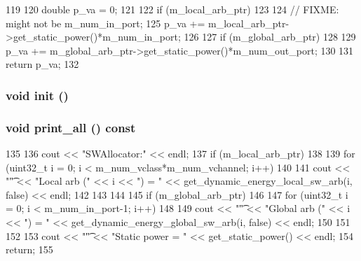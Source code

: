 \begin{DoxyCode}
119 {
120     double p_va = 0;
121 
122     if (m_local_arb_ptr)
123     {
124         // FIXME: might not be m_num_in_port;
125         p_va += m_local_arb_ptr->get_static_power()*m_num_in_port;
126     }
127     if (m_global_arb_ptr)
128     {
129         p_va += m_global_arb_ptr->get_static_power()*m_num_out_port;
130     }
131     return p_va;
132 }
\end{DoxyCode}
\hypertarget{classSWAllocator_a02fd73d861ef2e4aabb38c0c9ff82947}{
\subsubsection[{init}]{\setlength{\rightskip}{0pt plus 5cm}void init ()}}
\label{classSWAllocator_a02fd73d861ef2e4aabb38c0c9ff82947}
\hypertarget{classSWAllocator_a8404831790e4809674f0249ef6505cd5}{
\subsubsection[{print\_\-all}]{\setlength{\rightskip}{0pt plus 5cm}void print\_\-all () const}}
\label{classSWAllocator_a8404831790e4809674f0249ef6505cd5}



\begin{DoxyCode}
135 {
136     cout << "SWAllocator:" << endl;
137     if (m_local_arb_ptr)
138     {
139         for (uint32_t i = 0; i < m_num_vclass*m_num_vchannel; i++)
140         {
141             cout << "\t" << "Local arb (" << i << ") = " << 
      get_dynamic_energy_local_sw_arb(i, false) << endl;
142         }
143     }
144 
145     if (m_global_arb_ptr)
146     {
147         for (uint32_t i = 0; i < m_num_in_port-1; i++)
148         {
149             cout << "\t" << "Global arb (" << i << ") = " << 
      get_dynamic_energy_global_sw_arb(i, false) << endl;
150         }
151     }
152 
153     cout << "\t" << "Static power = " << get_static_power() << endl;
154     return;
155 }
\end{DoxyCode}


